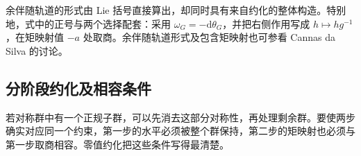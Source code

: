 余伴随轨道的形式由 Lie 括号直接算出，却同时具有来自约化的整体构造。特别地，式中的正号与两个选择配套：采用 \(\omega_G=-\mathrm{d}\theta_G\)，并把右侧作用写成 \(h\mapsto hg^{-1}\)，在矩映射值 \(-a\) 处取商。余伴随轨道形式及包含矩映射也可参看 Cannas da Silva 的讨论。\cite[第5.1节，第141--142页；第5.6节，第154页]{Cannas2006Symplectic}

\subsection{分阶段约化及相容条件}
\label{g4:subsec:1003:04}

若对称群中有一个正规子群，可以先消去这部分对称性，再处理剩余群。要使两步确实对应同一个约束，第一步的水平必须被整个群保持，第二步的矩映射也必须与第一步取商相容。零值约化把这些条件写得最清楚。

